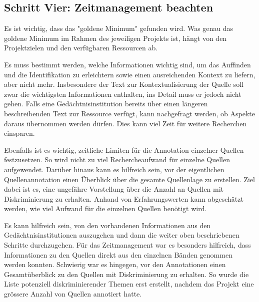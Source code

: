 \documentclass[
  letterpaper,
  DIV=11,
  numbers=noendperiod,
  landscape,
  a4paper,
  geometry:margin=1in]{scrartcl}
\begin{document}
\subsection{Schritt Vier: Zeitmanagement
beachten~~}\label{schritt-vier-zeitmanagement-beachten}

Es ist wichtig, dass das "goldene Minimum" gefunden wird. Was genau das
goldene Minimum im Rahmen des jeweiligen Projekts ist, hängt von den
Projektzielen und den verfügbaren Ressourcen ab.

Es muss bestimmt werden, welche Informationen wichtig sind, um das
Auffinden und die Identifikation zu erleichtern sowie einen
ausreichenden Kontext zu liefern, aber nicht mehr. Insbesondere der Text
zur Kontextualisierung der Quelle soll zwar die wichtigsten
Informationen enthalten, ins Detail muss er jedoch nicht gehen. Falls
eine Gedächtnisinstitution bereits über einen längeren beschreibenden
Text zur Ressource verfügt, kann nachgefragt werden, ob Aspekte daraus
übernommen werden dürfen. Dies kann viel Zeit für weitere Recherchen
einsparen.

Ebenfalls ist es wichtig, zeitliche Limiten für die Annotation einzelner
Quellen festzusetzen. So wird nicht zu viel Rechercheaufwand für
einzelne Quellen aufgewendet. Darüber hinaus kann es hilfreich sein, vor
der eigentlichen Quellenannotation einen Überblick über die gesamte
Quellenlage zu erstellen. Ziel dabei ist es, eine ungefähre Vorstellung
über die Anzahl an Quellen mit Diskriminierung zu erhalten. Anhand von
Erfahrungswerten kann abgeschätzt werden, wie viel Aufwand für die
einzelnen Quellen benötigt wird.

\begin{tcolorbox}[enhanced jigsaw, colframe=quarto-callout-tip-color-frame, bottomtitle=1mm, coltitle=black, opacitybacktitle=0.6, toprule=.15mm, opacityback=0, arc=.35mm, toptitle=1mm, title=\textcolor{quarto-callout-tip-color}{\faLightbulb}\hspace{0.5em}{Erfahrungen der Stadt.Geschichte.Basel}, colbacktitle=quarto-callout-tip-color!10!white, colback=white, bottomrule=.15mm, breakable, titlerule=0mm, rightrule=.15mm, leftrule=.75mm, left=2mm]

Es kann hilfreich sein, von den vorhandenen Informationen aus den
Gedächtnisinstitutionen auszugehen und dann die weiter oben
beschriebenen Schritte durchzugehen. Für das Zeitmanagement war es
besonders hilfreich, dass Informationen zu den Quellen direkt aus den
einzelnen Bänden genommen werden konnten. Schwierig war es hingegen, vor
den Annotationen einen Gesamtüberblick zu den Quellen mit
Diskriminierung zu erhalten. So wurde die Liste potenziell
diskriminierender Themen erst erstellt, nachdem das Projekt eine
grössere Anzahl von Quellen annotiert hatte.

\end{tcolorbox}
\end{document}
